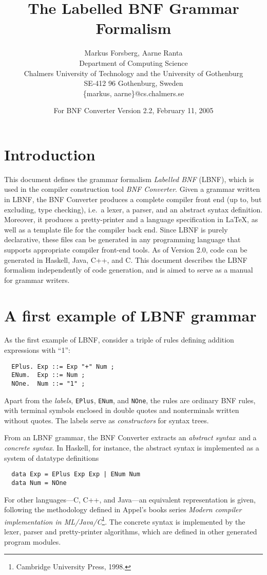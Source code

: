 \documentclass[10pt]{article}
\title{{\bf The Labelled BNF Grammar Formalism}}
\author{Markus Forsberg, Aarne Ranta \\
  Department of Computing Science \\
  Chalmers University of Technology and the University of Gothenburg \\
  SE-412 96 Gothenburg, Sweden\\
  \{markus, aarne\}@cs.chalmers.se}
\date{For BNF Converter Version 2.2, February 11, 2005}
\begin{document}
\maketitle


\section{Introduction}

This document defines
the grammar formalism \textit{Labelled BNF} (LBNF),
which is used in the compiler construction tool
\textit{BNF Converter}.
Given a grammar written in LBNF,
the BNF Converter produces a complete compiler
front end (up to, but excluding, type checking),
i.e.\ a lexer, a parser, and an abstract
syntax definition. Moreover, it produces a pretty-printer
and a language specification in \LaTeX, as well as
a template file for the compiler back end.
Since LBNF is purely declarative,
these files can be generated in any programming language that supports
appropriate compiler front-end tools. As of Version 2.0, code can be generated
in Haskell, Java, C++, and C.
This document describes the LBNF formalism independently of code generation,
and is aimed to serve as a manual for grammar writers.



\section{A first example of LBNF grammar}

As the first example of LBNF,
consider a triple of rules defining addition expressions with ``1'':
\begin{verbatim}
  EPlus. Exp ::= Exp "+" Num ;
  ENum.  Exp ::= Num ;
  NOne.  Num ::= "1" ;
\end{verbatim}
Apart from the \textit{labels}, {\tt EPlus}, {\tt ENum}, and {\tt NOne},
the rules are
ordinary BNF rules, with terminal symbols enclosed in
double quotes and nonterminals written without quotes.
The labels serve as \textit{constructors} for
syntax trees.

From an LBNF grammar, the BNF Converter extracts
an \textit{abstract syntax}\ and
a \textit{concrete syntax}.
In Haskell, for instance,
the abstract syntax is implemented as a system of
datatype definitions
\begin{verbatim}
  data Exp = EPlus Exp Exp | ENum Num
  data Num = NOne
\end{verbatim}
For other languages---C, C++, and Java---an equivalent
representation is given, following
the methodology defined in Appel's books series
{\em Modern compiler implementation in ML/Java/C}\footnote{
Cambridge University Press, 1998.}.
The concrete syntax is implemented by the
lexer, parser and pretty-printer algorithms,
which are defined in other generated program modules.
\end{document}

